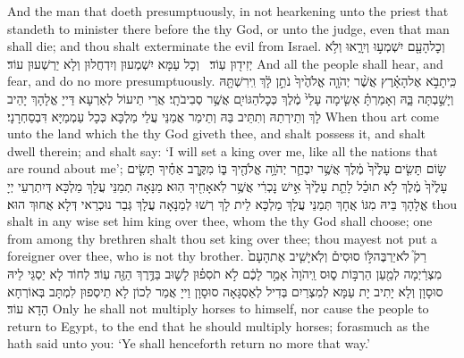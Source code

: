{And the man that doeth presumptuously, in not hearkening unto the priest that standeth to minister there before the \lord\space thy God, or unto the judge, even that man shall die; and thou shalt exterminate the evil from Israel.}{}
{וְכׇל\maqqaf הָעָ֖ם יִשְׁמְע֣וּ וְיִרָ֑אוּ וְלֹ֥א יְזִיד֖וּן עֽוֹד׃ \setuma }
{וְכָל עַמָּא יִשְׁמְעוּן וְיִדְחֲלוּן וְלָא יַרְשְׁעוּן עוֹד׃}
{And all the people shall hear, and fear, and do no more presumptuously.}{}
{כִּֽי\maqqaf תָבֹ֣א אֶל\maqqaf הָאָ֗רֶץ אֲשֶׁ֨ר יְהֹוָ֤ה אֱלֹהֶ֙יךָ֙ נֹתֵ֣ן לָ֔ךְ וִֽירִשְׁתָּ֖הּ וְיָשַׁ֣בְתָּה בָּ֑הּ וְאָמַרְתָּ֗ אָשִׂ֤ימָה עָלַי֙ מֶ֔לֶךְ כְּכׇל\maqqaf הַגּוֹיִ֖ם אֲשֶׁ֥ר סְבִיבֹתָֽי׃}
{אֲרֵי תֵיעוֹל לְאַרְעָא דַּייָ אֱלָהָךְ יָהֵיב לָךְ וְתֵירְתַהּ וְתִתֵּיב בַּהּ וְתֵימַר אֲמַנֵּי עֲלַי מַלְכָּא כְּכָל עַמְמַיָּא דִּבְסַחְרָנָי׃}
{When thou art come unto the land which the \lord\space thy God giveth thee, and shalt possess it, and shalt dwell therein; and shalt say: ‘I will set a king over me, like all the nations that are round about me’;}{}
{שׂ֣וֹם תָּשִׂ֤ים עָלֶ֙יךָ֙ מֶ֔לֶךְ אֲשֶׁ֥ר יִבְחַ֛ר יְהֹוָ֥ה אֱלֹהֶ֖יךָ בּ֑וֹ מִקֶּ֣רֶב אַחֶ֗יךָ תָּשִׂ֤ים עָלֶ֙יךָ֙ מֶ֔לֶךְ לֹ֣א תוּכַ֗ל לָתֵ֤ת עָלֶ֙יךָ֙ אִ֣ישׁ נׇכְרִ֔י אֲשֶׁ֥ר לֹֽא\maqqaf אָחִ֖יךָ הֽוּא׃}
{מַנָּאָה תְמַנֵּי עֲלָךְ מַלְכָּא דְּיִתְרְעֵי יְיָ אֱלָהָךְ בֵּיהּ מִגּוֹ אֲחָךְ תְּמַנֵּי עֲלָךְ מַלְכָּא לֵית לָךְ רְשׁוּ לְמַנָּאָה עֲלָךְ גְּבַר נוּכְרַאי דְּלָא אֲחוּךְ הוּא׃}
{thou shalt in any wise set him king over thee, whom the \lord\space thy God shall choose; one from among thy brethren shalt thou set king over thee; thou mayest not put a foreigner over thee, who is not thy brother.}{}
{רַק֮ לֹא\maqqaf יַרְבֶּה\maqqaf לּ֣וֹ סוּסִים֒ וְלֹֽא\maqqaf יָשִׁ֤יב אֶת\maqqaf הָעָם֙ מִצְרַ֔יְמָה לְמַ֖עַן הַרְבּ֣וֹת ס֑וּס וַֽיהֹוָה֙ אָמַ֣ר לָכֶ֔ם לֹ֣א תֹסִפ֗וּן לָשׁ֛וּב בַּדֶּ֥רֶךְ הַזֶּ֖ה עֽוֹד׃}
{לְחוֹד לָא יַסְגֵּי לֵיהּ סוּסָוָן וְלָא יָתִיב יָת עַמָּא לְמִצְרַיִם בְּדִיל לְאַסְגָּאָה סוּסָוָן וַייָ אֲמַר לְכוֹן לָא תֵיסְפוּן לִמְתָּב בְּאוֹרְחָא הָדָא עוֹד׃}
{Only he shall not multiply horses to himself, nor cause the people to return to Egypt, to the end that he should multiply horses; forasmuch as the \lord\space hath said unto you: ‘Ye shall henceforth return no more that way.’}{}

